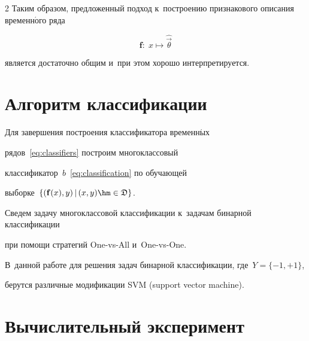 \begin{multicols}{2}
Таким образом, предложенный подход к~построению признакового описания временн$\acute{\mbox{о}}$го ряда


\begin{equation*}




\mathbf{f}:\;x\mapsto\hat{\vec\theta}


\end{equation*}


является достаточно общим и~при этом хорошо интерпретируется.








\section{Алгоритм классификации}







Для завершения построения классификатора временн$\acute{\mbox{ы}}$х 


рядов~\eqref{eq:classifiers} построим многоклассовый 


классификатор~$b$~\eqref{eq:classification} по обучающей 


выборке~$\left\{(\mathbf{f}(x),y)\,|\,(x,y)\hm\in\mathfrak{D}\right\}$.





Сведем задачу многоклассовой классификации к~задачам бинарной классификации 


при помощи стратегий One-vs-All и~One-vs-One.





В~данной работе для решения задач бинарной классификации, где~$Y=\{-1,+1\}$, 


берутся различные модификации SVM (support vector machine).





\vspace*{-6pt}








\section{Вычислительный эксперимент}



\end{multicols}
